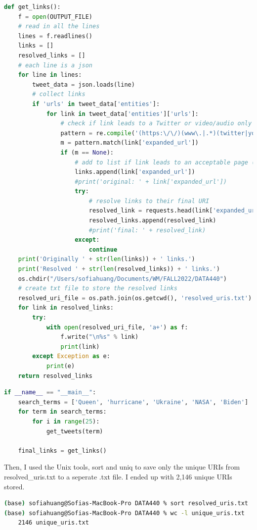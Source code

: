 \documentclass[12pt]{article}
\begin{document}
\begin{lstlisting}[language=Python, caption=Collecting tweets and extracting links, label=lst:copy]
def get_links():
    f = open(OUTPUT_FILE)
    # read in all the lines
    lines = f.readlines()  
    links = []
    resolved_links = []
    # each line is a json 
    for line in lines:
        tweet_data = json.loads(line) 
        # collect links 
        if 'urls' in tweet_data['entities']:
            for link in tweet_data['entities']['urls']:
                # check if link leads to a Twitter or video/audio only page using regex
                pattern = re.compile('(https:\/\/)(www\.|.*)(twitter|youtube|youtu|tiktok|twitch|soundcloud)(\.com|\.be)(.*)')
                m = pattern.match(link['expanded_url'])
                if (m == None):
                    # add to list if link leads to an acceptable page (not Twitter or video/audio)
                    links.append(link['expanded_url'])
                    #print('original: ' + link['expanded_url'])
                    try:
                        # resolve links to their final URI
                        resolved_link = requests.head(link['expanded_url'], allow_redirects=True, timeout=5).url
                        resolved_links.append(resolved_link)
                        #print('final: ' + resolved_link)
                    except:
                        continue
    print('Originally ' + str(len(links)) + ' links.')
    print('Resolved ' + str(len(resolved_links)) + ' links.')
    os.chdir("/Users/sofiahuang/Documents/WM/FALL2022/DATA440")
    # create txt file to store the resolved links
    resolved_uri_file = os.path.join(os.getcwd(), 'resolved_uris.txt')
    for link in resolved_links:
        try:
            with open(resolved_uri_file, 'a+') as f:
                f.write("\n%s" % link)
                print(link)
        except Exception as e:
            print(e)
    return resolved_links
\end{lstlisting}

\begin{lstlisting}[language=Python, caption=Running get\_tweets() and get_links(), label=lst:copy]
if __name__ == "__main__":
    search_terms = ['Queen', 'hurricane', 'Ukraine', 'NASA', 'Biden']
    for term in search_terms:
        for i in range(25):
            get_tweets(term)

    final_links = get_links()
\end{lstlisting}


Then, I used the Unix tools, sort and uniq to save only the unique URIs from resolved\_uris.txt to a seperate .txt file. I ended up with 2,146 unique URIs stored.

\begin{lstlisting}[language=bash, caption=Keeping only unique URIs, label=lst:copy]
(base) sofiahuang@Sofias-MacBook-Pro DATA440 % sort resolved_uris.txt | uniq > unique_uris.txt 
(base) sofiahuang@Sofias-MacBook-Pro DATA440 % wc -l unique_uris.txt
    2146 unique_uris.txt
\end{lstlisting}
\end{document}
